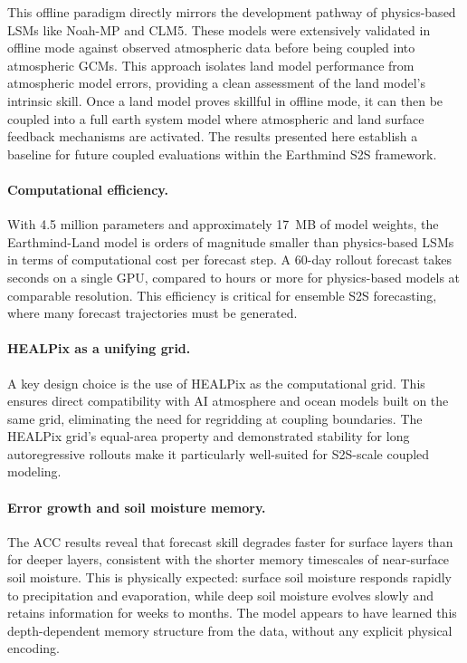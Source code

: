\documentclass[11pt]{article}
\begin{document}
This offline paradigm directly mirrors the development pathway of physics-based LSMs like Noah-MP \citep{niu2011noahmp} and CLM5. These models were extensively validated in offline mode against observed atmospheric data before being coupled into atmospheric GCMs. This approach isolates land model performance from atmospheric model errors, providing a clean assessment of the land model's intrinsic skill. Once a land model proves skillful in offline mode, it can then be coupled into a full earth system model where atmospheric and land surface feedback mechanisms are activated. The results presented here establish a baseline for future coupled evaluations within the Earthmind S2S framework.

\paragraph{Computational efficiency.} With 4.5 million parameters and approximately 17~MB of model weights, the Earthmind-Land model is orders of magnitude smaller than physics-based LSMs in terms of computational cost per forecast step. A 60-day rollout forecast takes seconds on a single GPU, compared to hours or more for physics-based models at comparable resolution. This efficiency is critical for ensemble S2S forecasting, where many forecast trajectories must be generated.

\paragraph{HEALPix as a unifying grid.} A key design choice is the use of HEALPix as the computational grid. This ensures direct compatibility with AI atmosphere and ocean models built on the same grid, eliminating the need for regridding at coupling boundaries. The HEALPix grid's equal-area property and demonstrated stability for long autoregressive rollouts \citep{karlbauer2024healpix} make it particularly well-suited for S2S-scale coupled modeling.

\paragraph{Error growth and soil moisture memory.} The ACC results reveal that forecast skill degrades faster for surface layers than for deeper layers, consistent with the shorter memory timescales of near-surface soil moisture. This is physically expected: surface soil moisture responds rapidly to precipitation and evaporation, while deep soil moisture evolves slowly and retains information for weeks to months. The model appears to have learned this depth-dependent memory structure from the data, without any explicit physical encoding.
\end{document}

